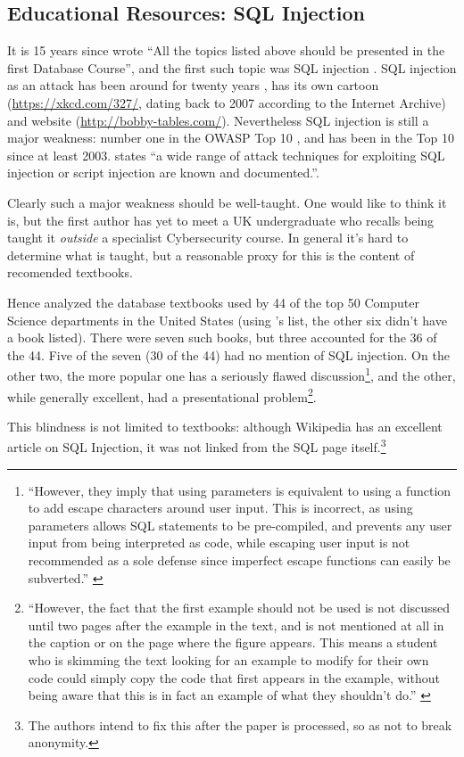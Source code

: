 \documentclass[conference]{IEEEtran}
\begin{document}


\subsection{Educational Resources: SQL Injection}\label{sec:SQL}
It is 15 years since \cite{Guimaraesetal2004} 
wrote ``All the topics listed above should be presented in the first
Database Course'', and the first such topic was SQL injection \cite{SPIDynamics2002,Anonymous2018b}. SQL injection as an attack has been around for twenty years \cite{HornerHyslip2017a}, has its own cartoon (\url{https://xkcd.com/327/}, dating back to 2007 according to the Internet Archive) and website (\url{http://bobby-tables.com/}). Nevertheless SQL injection is still a major weakness: number one in the OWASP Top 10 \cite{OWASP2017a}, and has been in the Top 10 since at least 2003.  \cite[the UK's definitive reference]{Bristol2018a} states ``a wide range of attack techniques for exploiting SQL
injection or script injection are known and documented.''.

Clearly such a major weakness should be well-taught. One would like to think it is, but the first author has yet to meet a UK undergraduate who recalls being taught it \emph{outside} a specialist Cybersecurity course.  In general it's hard to determine what is taught, but a reasonable proxy for this is the content of recomended textbooks. 

Hence \cite{Drop2019} analyzed the database textbooks used by  44 of the top 50 Computer Science
departments in the United States (using \cite{StangerMartin2015a}'s list, the other six didn't have a book listed). There were seven such books, but three accounted for the 36 of the 44. Five of the seven (30 of the 44) had no mention of SQL injection. On the other two, the more popular one has a seriously flawed discussion\footnote{``However, they imply that using parameters is equivalent to using a function to add escape characters
around user input. This is incorrect, as using parameters allows
SQL statements to be pre-compiled, and prevents any user input
from being interpreted as code, while escaping user input is not
recommended as a sole defense since imperfect escape functions
can easily be subverted.'' \cite{Drop2019}}, and the other, while generally excellent, had a presentational problem\footnote{``However, the fact that the first
example should not be used is not discussed until two pages after
the example in the text, and is not mentioned at all in the caption or
on the page where the figure appears. This means a student who is
skimming the text looking for an example to modify for their own
code could simply copy the code that first appears in the example,
without being aware that this is in fact an example of what they
shouldn't do.'' \cite{Drop2019}}.
\par
This blindness is not limited to textbooks: although Wikipedia has an excellent article on SQL Injection, it was not linked from the SQL page itself.\footnote{The authors intend to fix this after the paper is processed, so as not to break anonymity.}
\end{document}
